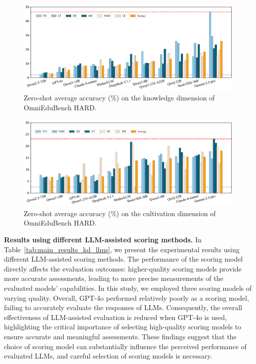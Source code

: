 \begin{figure}[tbp]
    \centering
    \includegraphics[height=0.41\textwidth]{figure/omnihardkd.pdf}
    \vspace{-5mm}
    \caption{Zero-shot average accuracy (\%) on the knowledge  dimension of OmniEduBench HARD.}
    \label{fig:omnihard_kd}
    \vspace{-3mm}
\end{figure}

\begin{figure}[tbp]
    \centering
    \includegraphics[height=0.41\textwidth]{figure/omnihardcd.pdf}
    \vspace{-5mm}
    \caption{Zero-shot average accuracy (\%) on the cultivation  dimension of OmniEduBench HARD.}
    \label{fig:omnihard_cd}
    \vspace{-3mm}
\end{figure}

\textbf{Results using different LLM-assisted scoring methods.}
In Table~\ref{tab:main_results_kd_llms}, we present the experimental results using different LLM-assisted scoring methods. The performance of the scoring model directly affects the evaluation outcomes: higher-quality scoring models provide more accurate assessments, leading to more precise measurements of the evaluated models’ capabilities. In this study, we employed three scoring models of varying quality. Overall, GPT-4o performed relatively poorly as a scoring model, failing to accurately evaluate the responses of LLMs. Consequently, the overall effectiveness of LLM-assisted evaluation is reduced when GPT-4o is used, highlighting the critical importance of selecting high-quality scoring models to ensure accurate and meaningful assessments. These findings suggest that the choice of scoring model can substantially influence the perceived performance of evaluated LLMs, and careful selection of scoring models is necessary.

